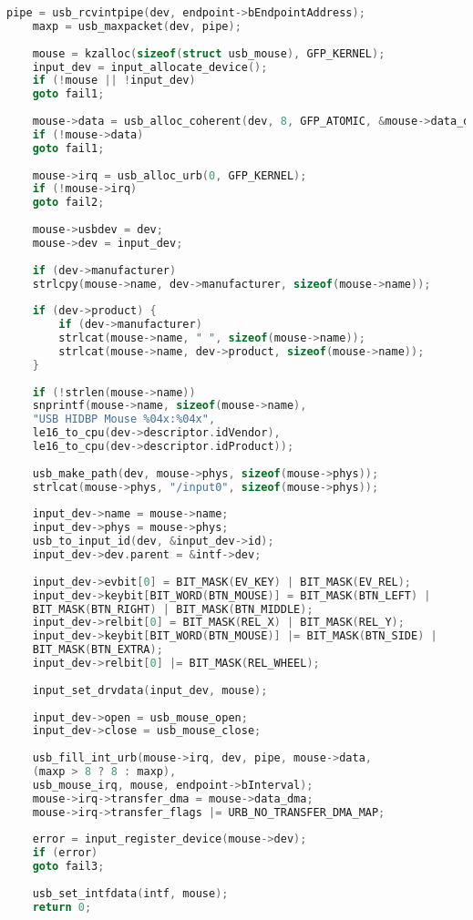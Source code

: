 \begin{lstlisting}[language=C, label=lst:all, caption=Полный код драйвера]
	pipe = usb_rcvintpipe(dev, endpoint->bEndpointAddress);
	maxp = usb_maxpacket(dev, pipe);
	
	mouse = kzalloc(sizeof(struct usb_mouse), GFP_KERNEL);
	input_dev = input_allocate_device();
	if (!mouse || !input_dev)
	goto fail1;
	
	mouse->data = usb_alloc_coherent(dev, 8, GFP_ATOMIC, &mouse->data_dma);
	if (!mouse->data)
	goto fail1;
	
	mouse->irq = usb_alloc_urb(0, GFP_KERNEL);
	if (!mouse->irq)
	goto fail2;
	
	mouse->usbdev = dev;
	mouse->dev = input_dev;
	
	if (dev->manufacturer)
	strlcpy(mouse->name, dev->manufacturer, sizeof(mouse->name));
	
	if (dev->product) {
		if (dev->manufacturer)
		strlcat(mouse->name, " ", sizeof(mouse->name));
		strlcat(mouse->name, dev->product, sizeof(mouse->name));
	}
	
	if (!strlen(mouse->name))
	snprintf(mouse->name, sizeof(mouse->name),
	"USB HIDBP Mouse %04x:%04x",
	le16_to_cpu(dev->descriptor.idVendor),
	le16_to_cpu(dev->descriptor.idProduct));
	
	usb_make_path(dev, mouse->phys, sizeof(mouse->phys));
	strlcat(mouse->phys, "/input0", sizeof(mouse->phys));
	
	input_dev->name = mouse->name;
	input_dev->phys = mouse->phys;
	usb_to_input_id(dev, &input_dev->id);
	input_dev->dev.parent = &intf->dev;
	
	input_dev->evbit[0] = BIT_MASK(EV_KEY) | BIT_MASK(EV_REL);
	input_dev->keybit[BIT_WORD(BTN_MOUSE)] = BIT_MASK(BTN_LEFT) |
	BIT_MASK(BTN_RIGHT) | BIT_MASK(BTN_MIDDLE);
	input_dev->relbit[0] = BIT_MASK(REL_X) | BIT_MASK(REL_Y);
	input_dev->keybit[BIT_WORD(BTN_MOUSE)] |= BIT_MASK(BTN_SIDE) |
	BIT_MASK(BTN_EXTRA);
	input_dev->relbit[0] |= BIT_MASK(REL_WHEEL);
	
	input_set_drvdata(input_dev, mouse);
	
	input_dev->open = usb_mouse_open;
	input_dev->close = usb_mouse_close;
	
	usb_fill_int_urb(mouse->irq, dev, pipe, mouse->data,
	(maxp > 8 ? 8 : maxp),
	usb_mouse_irq, mouse, endpoint->bInterval);
	mouse->irq->transfer_dma = mouse->data_dma;
	mouse->irq->transfer_flags |= URB_NO_TRANSFER_DMA_MAP;
	
	error = input_register_device(mouse->dev);
	if (error)
	goto fail3;
	
	usb_set_intfdata(intf, mouse);
	return 0;
	

\end{lstlisting}
